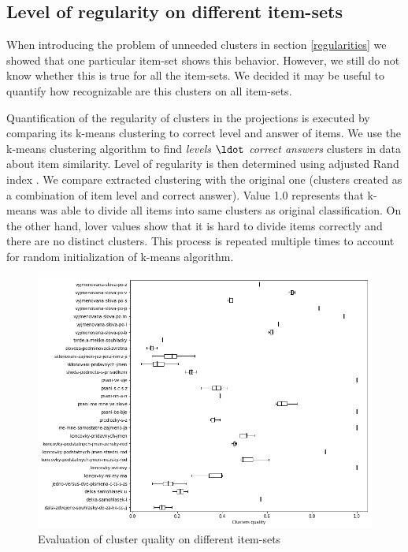 \documentclass[
  digital, %
  table,   %
  nolof,     %
  nolot,     %
  nocover,
  color,
  final, %
]{fithesis3}
\begin{document}

\subsection{Level of regularity on different item-sets}\label{level-of-regularity-on-different-item-sets}

When introducing the problem of unneeded clusters in section \ref{regularities} we showed that one particular item-set shows this behavior. However, we still do not know whether this is true for all the item-sets. We decided it may be useful to quantify how recognizable are this clusters on all item-sets.


Quantification of the regularity of clusters in the projections is executed by comparing its k-means clustering to correct level and answer of items. We use the k-means clustering algorithm \cite{TODO} to find \textit{levels $\ldot$ correct answers} clusters in data about item similarity. Level of regularity is then determined using adjusted Rand index \cite{santos2009use}. We compare extracted clustering with the original one (clusters created as a combination of item level and correct answer). Value 1.0 represents that k-means was able to divide all items into same clusters as original classification. On the other hand, lover values show that it is hard to divide items correctly and there are no distinct clusters. This process is repeated multiple times to account for random initialization of k-means algorithm.

\begin{figure}
  \includegraphics[width=\textwidth]{img/clustering_quality}
  \caption{Evaluation of cluster quality on different item-sets}
  \label{fig:clustering_quality}
\end{figure}
\end{document}
